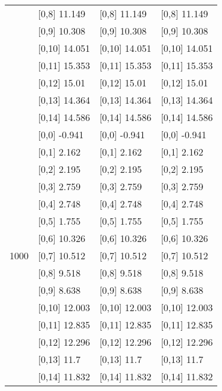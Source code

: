 \begin{table}
\begin{tabular}[t]{llll}
 & {}[0,8] 11.149 & {}[0,8] 11.149 & {}[0,8] 11.149\\
 & {}[0,9] 10.308 & {}[0,9] 10.308 & {}[0,9] 10.308\\
\addlinespace
 & {}[0,10] 14.051 & {}[0,10] 14.051 & {}[0,10] 14.051\\
 & {}[0,11] 15.353 & {}[0,11] 15.353 & {}[0,11] 15.353\\
 & {}[0,12] 15.01 & {}[0,12] 15.01 & {}[0,12] 15.01\\
 & {}[0,13] 14.364 & {}[0,13] 14.364 & {}[0,13] 14.364\\
 & {}[0,14] 14.586 & {}[0,14] 14.586 & {}[0,14] 14.586\\
\addlinespace
 & {}[0,0] -0.941 & {}[0,0] -0.941 & {}[0,0] -0.941\\
 & {}[0,1] 2.162 & {}[0,1] 2.162 & {}[0,1] 2.162\\
 & {}[0,2] 2.195 & {}[0,2] 2.195 & {}[0,2] 2.195\\
 & {}[0,3] 2.759 & {}[0,3] 2.759 & {}[0,3] 2.759\\
 & {}[0,4] 2.748 & {}[0,4] 2.748 & {}[0,4] 2.748\\
\addlinespace
 & {}[0,5] 1.755 & {}[0,5] 1.755 & {}[0,5] 1.755\\
 & {}[0,6] 10.326 & {}[0,6] 10.326 & {}[0,6] 10.326\\
1000 & {}[0,7] 10.512 & {}[0,7] 10.512 & {}[0,7] 10.512\\
 & {}[0,8] 9.518 & {}[0,8] 9.518 & {}[0,8] 9.518\\
 & {}[0,9] 8.638 & {}[0,9] 8.638 & {}[0,9] 8.638\\
\addlinespace
 & {}[0,10] 12.003 & {}[0,10] 12.003 & {}[0,10] 12.003\\
 & {}[0,11] 12.835 & {}[0,11] 12.835 & {}[0,11] 12.835\\
 & {}[0,12] 12.296 & {}[0,12] 12.296 & {}[0,12] 12.296\\
 & {}[0,13] 11.7 & {}[0,13] 11.7 & {}[0,13] 11.7\\
 & {}[0,14] 11.832 & {}[0,14] 11.832 & {}[0,14] 11.832\\
\bottomrule
\end{tabular}
\end{table}
